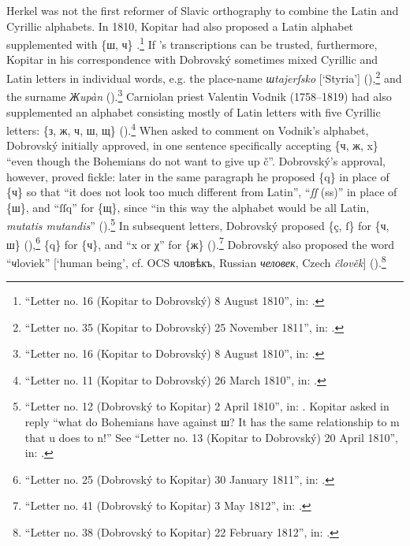 Herkel was not the first reformer of Slavic orthography to combine the Latin and Cyrillic alphabets. In 1810, Kopitar had also proposed a Latin alphabet supplemented with \{ш, ч\} \citep[163]{jagic_pisma_1895}.\footnote{“Letter no. 16 (Kopitar to Dobrovský) 8 August 1810”, in: \citet[163]{jagic_pisma_1895}.} If \citeauthor{jagic_pisma_1895}’s transcriptions can be trusted, furthermore, Kopitar in his correspondence with Dobrovský sometimes mixed Cyrillic and Latin letters in individual words, e.g. the place-name \textit{шtajerſsko} [‘Styria’] (\citeyear[232]{jagic_pisma_1895}),\footnote{“Letter no. 35 (Kopitar to Dobrovský) 25 November 1811”, in: \citet[232]{jagic_pisma_1895}.} and the surname \textit{Жupàn} (\citeyear[159, 161]{jagic_pisma_1895}).\footnote{“Letter no. 16 (Kopitar to Dobrovský) 8 August 1810”, in: \citet[159, 161]{jagic_pisma_1895}.} Carniolan priest Valentin Vodnik (1758--1819) had also supplemented an alphabet consisting most\-ly of Latin letters with five Cyrillic letters: \{з, ж, ч, ш, щ\} (\citeyear[130]{jagic_pisma_1895}).\footnote{“Letter no. 11 (Kopitar to Dobrovský) 26 March 1810”, in: \citet[130]{jagic_pisma_1895}.} When asked to comment on Vodnik’s alphabet, Dobrovský initially approved, in one sentence specifically accepting \{ч, ж, x\} “even though the Bohemians do not want to give up č”. Dobrovský’s approval, however, proved fickle: later in the same paragraph he proposed \{q\} in place of \{ч\} so that “it does not look too much different from Latin”, “\textit{ſſ} (ss)” in place of \{ш\}, and “ſſq” for \{щ\}, since “in this way the alphabet would be all Latin, \textit{mutatis mutandis}” (\citeyear[132]{jagic_pisma_1895}).\footnote{“Letter no. 12 (Dobrovský to Kopitar) 2 April 1810”, in: \citet[132]{jagic_pisma_1895}. Kopitar asked in reply “what do Bohemians have against ш? It has the same relationship to m that u does to n!” See “Letter no. 13 (Kopitar to Dobrovský) 20 April 1810”, in: \citet[142]{jagic_pisma_1895}.} In subsequent letters, Dobrovský proposed \{ç, ſ\} for \{ч, ш\} (\citeyear[187]{jagic_pisma_1895}),\footnote{“Letter no. 25 (Dobrovský to Kopitar) 30 January 1811”, in: \citet[187]{jagic_pisma_1895}.} \{q\} for \{ч\}, and “x or χ” for \{ж\} (\citeyear[259]{jagic_pisma_1895}).\footnote{“Letter no. 41 (Dobrovský to Kopitar) 3 May 1812”, in: \citet[259]{jagic_pisma_1895}.} Dobrovský also proposed the word “\textit{ч}loviek” [‘human being’, cf. OCS {\mono чловѣкъ}, Russian \textit{человек}, Czech \textit{člověk}] (\citeyear[245]{jagic_pisma_1895}).\footnote{“Letter no. 38 (Dobrovský to Kopitar) 22 February 1812”, in: \citet[245]{jagic_pisma_1895}.}

